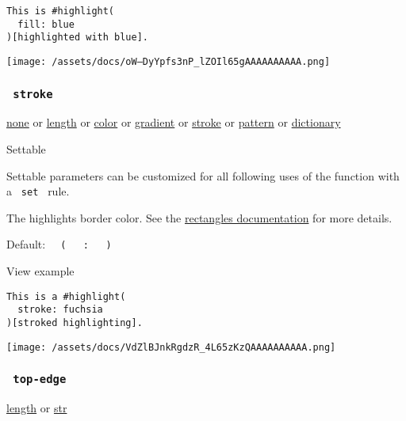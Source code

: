 \begin{verbatim}
This is #highlight(
  fill: blue
)[highlighted with blue].
\end{verbatim}

\texttt{[image: /assets/docs/oW--DyYpfs3nP\_lZOIl65gAAAAAAAAAA.png]}

\subsubsection{\texorpdfstring{\texttt{\ stroke\ }}{ stroke }}\label{parameters-stroke}

\href{/docs/reference/foundations/none/}{none} {or}
\href{/docs/reference/layout/length/}{length} {or}
\href{/docs/reference/visualize/color/}{color} {or}
\href{/docs/reference/visualize/gradient/}{gradient} {or}
\href{/docs/reference/visualize/stroke/}{stroke} {or}
\href{/docs/reference/visualize/pattern/}{pattern} {or}
\href{/docs/reference/foundations/dictionary/}{dictionary}

{{ Settable }}

\label{parameters-stroke-settable-tooltip}
Settable parameters can be customized for all following uses of the
function with a \texttt{\ set\ } rule.

The highlight\textquotesingle s border color. See the
\href{/docs/reference/visualize/rect/\#parameters-stroke}{rectangle\textquotesingle s
documentation} for more details.

Default:
\texttt{\ }{\texttt{\ (\ }}\texttt{\ }{\texttt{\ :\ }}\texttt{\ }{\texttt{\ )\ }}\texttt{\ }


View example

\begin{verbatim}
This is a #highlight(
  stroke: fuchsia
)[stroked highlighting].
\end{verbatim}

\texttt{[image: /assets/docs/VdZlBJnkRgdzR\_4L65zKzQAAAAAAAAAA.png]}

\subsubsection{\texorpdfstring{\texttt{\ top-edge\ }}{ top-edge }}\label{parameters-top-edge}

\href{/docs/reference/layout/length/}{length} {or}
\href{/docs/reference/foundations/str/}{str}

